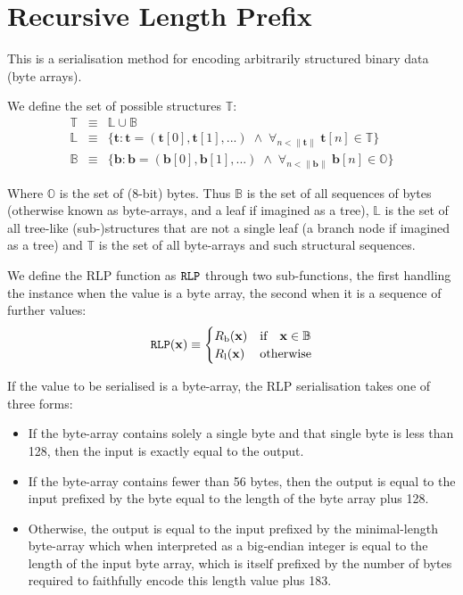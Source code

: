 \documentclass[9pt,oneside]{amsart}
\makeatletter
\newcommand{\linkdest}[1]{\Hy@raisedlink{\hypertarget{#1}{}}}
\makeatother
\begin{document}
\section{Recursive Length Prefix}\label{app:rlp}\hypertarget{rlp}{}
This is a serialisation method for encoding arbitrarily structured binary data (byte arrays).

We define the set of possible structures $\mathbb{T}$:
\begin{eqnarray}
\mathbb{T} & \equiv & \mathbb{L} \cup \mathbb{B} \\
\mathbb{L} & \equiv & \{ \mathbf{t}: \mathbf{t} = ( \mathbf{t}[0], \mathbf{t}[1], ... ) \; \wedge \; \forall_{n < \lVert \mathbf{t} \rVert} \; \mathbf{t}[n] \in \mathbb{T} \} \\
\mathbb{B} & \equiv & \{ \mathbf{b}: \mathbf{b} = ( \mathbf{b}[0], \mathbf{b}[1], ... ) \; \wedge \; \forall_{n < \lVert \mathbf{b} \rVert} \; \mathbf{b}[n] \in \mathbb{O} \}
\end{eqnarray}

Where $\mathbb{O}$ is the set of (8-bit) bytes. Thus $\mathbb{B}$ is the set of all sequences of bytes (otherwise known as byte-arrays, and a leaf if imagined as a tree), $\mathbb{L}$ is the set of all tree-like (sub-)structures that are not a single leaf (a branch node if imagined as a tree) and $\mathbb{T}$ is the set of all byte-arrays and such structural sequences.

We define the RLP function as $\mathtt{\tiny RLP}$ through two sub-functions, the first handling the instance when the value is a byte array, the second when it is a sequence of further values:
\begin{equation}
\mathtt{\tiny RLP}(\mathbf{x}) \equiv \begin{cases} R_{\mathrm{b}}(\mathbf{x}) & \text{if} \quad \mathbf{x} \in \mathbb{B} \\ R_{\mathrm{l}}(\mathbf{x}) & \text{otherwise} \end{cases}
\end{equation}

\hypertarget{RLP_serialisation_of_a_byte_array_R__b_word_def}{}\linkdest{R__b}If the value to be serialised is a byte-array, the RLP serialisation takes one of three forms:

\begin{itemize}
\item If the byte-array contains solely a single byte and that single byte is less than 128, then the input is exactly equal to the output.
\item If the byte-array contains fewer than 56 bytes, then the output is equal to the input prefixed by the byte equal to the length of the byte array plus 128.
\item Otherwise, the output is equal to the input prefixed by the minimal-length byte-array which when interpreted as a big-endian integer is equal to the length of the input byte array, which is itself prefixed by the number of bytes required to faithfully encode this length value plus 183.
\end{itemize}
\end{document}

